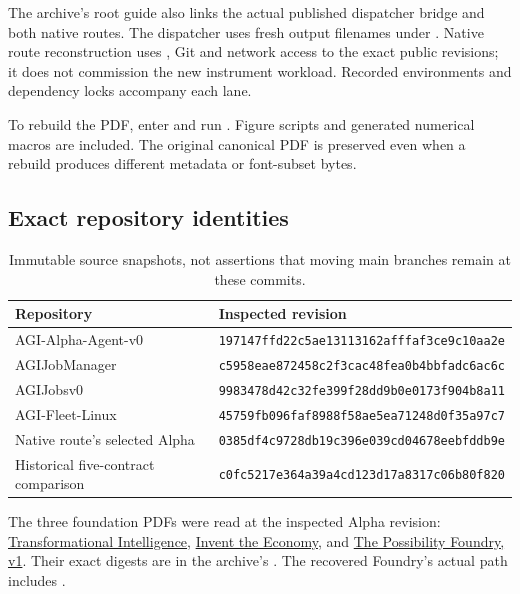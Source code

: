 The archive's root guide also links the actual published dispatcher bridge and both native routes. The dispatcher uses fresh output filenames under . Native route reconstruction uses , Git and network access to the exact public revisions; it does not commission the new instrument workload. Recorded environments and dependency locks accompany each lane.

To rebuild the PDF, enter  and run . Figure scripts and generated numerical macros are included. The original canonical PDF is preserved even when a rebuild produces different metadata or font-subset bytes.

\subsection{Exact repository identities}
\begin{table}[H]\footnotesize\renewcommand{\arraystretch}{1.2}
\begin{tabular}{@{}ll@{}}\toprule
Repository & Inspected revision\\\midrule
AGI-Alpha-Agent-v0 & \texttt{197147ffd22c5ae13113162afffaf3ce9c10aa2e}\\
AGIJobManager & \texttt{c5958eae872458c2f3cac48fea0b4bbfadc6ac6c}\\
AGIJobsv0 & \texttt{9983478d42c32fe399f28dd9b0e0173f904b8a11}\\
AGI-Fleet-Linux & \texttt{45759fb096faf8988f58ae5ea71248d0f35a97c7}\\
Native route's selected Alpha & \texttt{0385df4c9728db19c396e039cd04678eebfddb9e}\\
Historical five-contract comparison & \texttt{c0fc5217e364a39a4cd123d17a8317c06b80f820}\\\bottomrule
\end{tabular}
\caption{Immutable source snapshots, not assertions that moving main branches remain at these commits.}
\end{table}

The three foundation PDFs were read at the inspected Alpha revision: \href{https://github.com/MontrealAI/AGI-Alpha-Agent-v0/blob/197147ffd22c5ae13113162afffaf3ce9c10aa2e/docs/Transformational_Intelligence.pdf}{Transformational Intelligence}, \href{https://github.com/MontrealAI/AGI-Alpha-Agent-v0/blob/197147ffd22c5ae13113162afffaf3ce9c10aa2e/docs/Invent_the_Economy.pdf}{Invent the Economy}, and \href{https://github.com/MontrealAI/AGI-Alpha-Agent-v0/blob/197147ffd22c5ae13113162afffaf3ce9c10aa2e/docs/papers/possibility-foundry-v1.pdf}{The Possibility Foundry, v1}. Their exact digests are in the archive's . The recovered Foundry's actual path includes .

